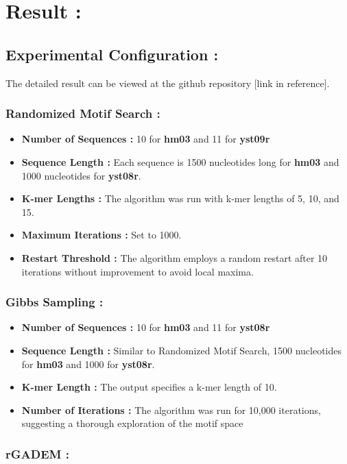 \section{Result :}
\subsection{Experimental Configuration : }
The detailed result can be viewed at the github repository [link in reference].
\subsubsection{Randomized Motif Search : }
\begin{itemize}
    \item \textbf{Number of Sequences : }10 for \textbf{hm03} and 11 for \textbf{yst09r}
    \item \textbf{Sequence Length : } Each sequence is 1500 nucleotides long for \textbf{hm03} and 1000 nucleotides for \textbf{yst08r}.
    \item \textbf{K-mer Lengths : }The algorithm was run with k-mer lengths of 5, 10, and 15.
    \item \textbf{Maximum Iterations : }Set to 1000.
    \item \textbf{Restart Threshold : }The algorithm employs a random restart after 10 iterations without improvement to avoid local maxima.
\end{itemize}
\subsubsection{Gibbs Sampling :}
\begin{itemize}
    \item \textbf{Number of Sequences : }10 for \textbf{hm03} and 11 for \textbf{yst08r}
    \item \textbf{Sequence Length : } Similar to Randomized Motif Search, 1500 nucleotides for \textbf{hm03} and 1000 for \textbf{yst08r}.
    \item \textbf{K-mer Length : }The output specifies a k-mer length of 10.
    \item \textbf{Number of Iterations : }The algorithm was run for 10,000 iterations, suggesting a thorough exploration of the motif space
\end{itemize}
\subsubsection{rGADEM :}


